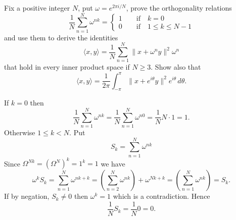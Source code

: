\begin{enumerate}
\begin{excopy}
Fix a positive integer $N$,
put \(\omega = e^{2\pi i/N}\), prove the orthogonality relations
\begin{equation*}
 \frac{1}{N} \sum_{n=1}^N \omega^{nk} =
 \left\{\begin{array}{ll}
         1 \qquad \textrm{if}\quad k=0\\
         0 \qquad \textrm{if}\quad 1\leq k \leq N - 1
        \end{array}\right.
\end{equation*}
and use them to derive the identities
\begin{equation*}
\langle x, y \rangle = \frac{1}{N} \sum_{n=1}^N \|x + \omega^n y\|^2 \omega^n
\end{equation*}
that hold in every inner product space if \(N\geq 3\). Show also that
\begin{equation*}
\langle x, y \rangle
 = \frac{1}{2\pi} \int_{-\pi}^\pi \|x + e^{i\theta} y\|^2 e^{i\theta}\,d\theta.
\end{equation*}
\end{excopy}

If \(k=0\) then
\begin{equation*}
  \frac{1}{N} \sum_{n=1}^N \omega^{nk}
= \frac{1}{N} \sum_{n=1}^N \omega^{n0}
= \frac{1}{N} N\cdot 1
= 1.
\end{equation*}
Otherwise \( 1\leq k < N\). Put
\begin{equation*}
S_k = \sum_{n=1}^N \omega^{nk}
\end{equation*}
Since \(\Omega^{Nk} = (\Omega^N)^k = 1^k = 1\) we have
\begin{equation*}
\omega^k S_k
= \sum_{n=1}^N \omega^{nk + k}
= \left(\sum_{n=2}^N \omega^{nk}\right) +  \omega^{Nk + k}
= \left(\sum_{n=1}^N \omega^{nk}\right)
= S_k.
\end{equation*}
If by negation, \(S_k\neq 0\) then
 \(\omega^k= 1\) which is a contradiction. Hence
\begin{equation*}
\frac{1}{N}S_k = \frac{1}{N}0 = 0.
\end{equation*}


\end{enumerate}

